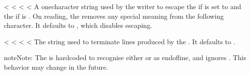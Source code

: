 \documentclass[letterpaper,10pt,english]{sphinxmanual}
\begin{document}
\begin{fulllineitems}
\label{\detokenize{csv:csv.Dialect.escapechar}}<%
\pysigstartsignatures
<%
<%
<%
A one\sphinxhyphen{}character string used by the writer to escape the  if 
is set to {\hyperref[\detokenize{csv:csv.QUOTE_NONE}]{}} and the  if  is
. On reading, the  removes any special meaning from
the following character. It defaults to , which disables escaping.

\end{fulllineitems}


\vspace{5px}

\begin{fulllineitems}
\label{\detokenize{csv:csv.Dialect.lineterminator}}<%
\pysigstartsignatures
<%
<%
<%
The string used to terminate lines produced by the {\hyperref[\detokenize{csv:csv.writer}]{}}. It defaults
to .

\begin{sphinxadmonition}{note}{Note:}
The {\hyperref[\detokenize{csv:csv.reader}]{}} is hard\sphinxhyphen{}coded to recognise either  or  as
end\sphinxhyphen{}of\sphinxhyphen{}line, and ignores . This behavior may change in the
future.
\end{sphinxadmonition}

\end{fulllineitems}
\end{document}
